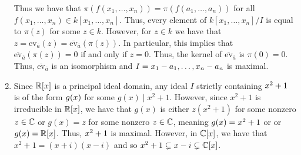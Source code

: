 \documentclass[letterpaper, 11pt, oneside]{book}
\begin{document}
\begin{pf}
\begin{enumerate}[label= (\alph*)]
          Thus we have that $\pi(f(x_{1}, \ldots, x_{n})) = \pi(f(a_{1}, \ldots, a_{n}))$ for all $f(x_{1}, \ldots, x_{n}) \in k[x_{1}, \ldots, x_{n}]$.
          Thus, every element of $k[x_{1}, \ldots, x_{n}] / I$ is equal to $\pi(z)$ for some $z \in k$.
          However, for $z \in k$ we have that $z = \text{ev}_{\overline{a}}(z) = \overline{\text{ev}}_{\overline{a}}(\pi(z))$.
          In particular, this implies that $\overline{\text{ev}}_{\overline{a}}(\pi(z)) = 0$ if and only if $z = 0$.
          Thus, the kernel of $\overline{\text{ev}}_{\overline{a}}$ is $\pi(0) = 0$.
          Thus, $\overline{\text{ev}}_{\overline{a}}$ is an isomorphism and $I = \ideal{x_{1} - a_{1}, \ldots, x_{n} - a_{n}}$ is maximal.
    \item Since $\mathbb{R}[x]$ is a principal ideal domain, any ideal $I$ strictly containing $\ideal{x^{2} + 1}$ is of the form $\ideal{g(x)}$ for some $g(x) \mid x^{2} + 1$.
          However, since $x^{2} + 1$ is irreducible in $\mathbb{R}[x]$, we have that $g(x)$ is either $z(x^{2} + 1)$ for some nonzero $z \in \mathbb{C}$ or $g(x) = z$ for some nonzero $z \in \mathbb{C}$, meaning $\ideal{g(x)} = \ideal{x^{2} + 1}$ or or $\ideal{g(x)} = \R[x]$.
          Thus, $\ideal{x^{2} + 1}$ is maximal.
          However, in $\mathbb{C}[x]$, we have that $x^{2} + 1 = (x + i)(x - i)$ and so $\ideal{x^{2} + 1} \subsetneq \ideal{x - i} \subsetneq \C[x]$.
  \end{enumerate}
\end{pf}

\printbibliography
\end{document}

